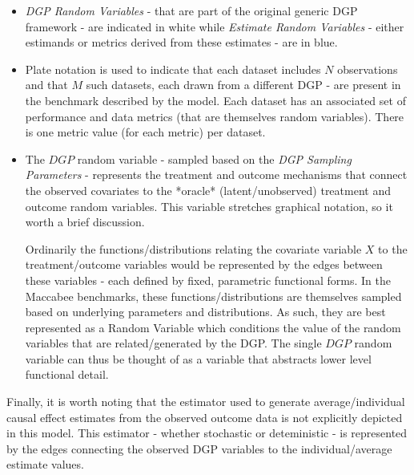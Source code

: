 \documentclass[../main.tex]{subfiles}
\begin{document}
\begin{itemize}
    \item \textit{DGP Random Variables} - that are part of the original generic DGP framework - are indicated in white while \textit{Estimate Random Variables} - either estimands or metrics derived from these estimates - are in blue.

    \item Plate notation is used to indicate that each dataset includes $N$ observations and that $M$ such datasets, each drawn from a different DGP - are present in the benchmark described by the model. Each dataset has an associated set of performance and data metrics (that are themselves random variables). There is one metric value (for each metric) per dataset.

    \item The $DGP$ random variable - sampled based on the \textit{DGP Sampling Parameters} - represents the treatment and outcome mechanisms that connect the observed covariates to the *oracle* (latent/unobserved) treatment and outcome random variables. This variable stretches graphical notation, so it worth a brief discussion.

    \vspace{\baselineskip}

    Ordinarily the functions/distributions relating the covariate variable $X$ to the treatment/outcome variables would be represented by the edges between these variables - each defined by fixed, parametric functional forms. In the Maccabee benchmarks, these functions/distributions are themselves sampled based on underlying parameters and distributions. As such, they are best represented as a Random Variable which conditions the value of the random variables that are related/generated by the DGP. The single $DGP$ random variable can thus be thought of as a variable that abstracts lower level functional detail.

\end{itemize}

Finally, it is worth noting that the estimator used to generate average/individual causal effect estimates from the observed outcome data is not explicitly depicted in this model. This estimator - whether stochastic or deteministic - is represented by the edges connecting the observed DGP variables to the individual/average estimate values.
\end{document}
